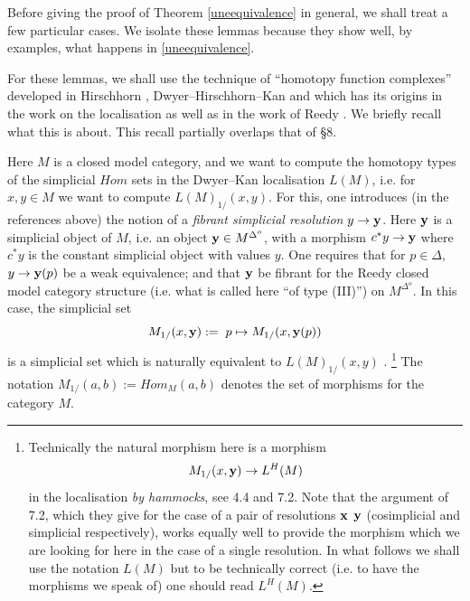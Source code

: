 Before giving the proof of Theorem \ref{uneequivalence}
in general, we shall treat a few particular cases. We isolate
these lemmas because they show well, by
examples, what happens in \ref{uneequivalence}.

For these lemmas, we shall use the technique of ``homotopy function
complexes''
developed in Hirschhorn \cite{Hirschhorn}, Dwyer--Hirschhorn--Kan
\cite{DHK} and which has its origins in the work on the localisation
\cite{DwyerKan3} as well as in the work of Reedy \cite{Reedy}.
We briefly recall what
this is about.
This recall partially overlaps that of \S 8.

Here $M$ is a closed model category, and we want
to compute the homotopy types of the simplicial $Hom$ sets in the
Dwyer--Kan localisation $L(M)$, i.e. for $x,y\in M$ we want to compute
$L(M)_{1/}(x,y)$. For this, one introduces (in the references above)
the notion of a {\em fibrant simplicial resolution} $y\rightarrow {\bf y}$.
Here ${\bf y}$ is a simplicial object of $M$, i.e. an object ${\bf y}\in
M^{\Delta ^o}$, with a morphism $c^{\ast} y\rightarrow {\bf y}$ where
$c^{\ast} y$ is the constant simplicial object with values $y$. One requires
that
for $p\in \Delta$, $y\rightarrow {\bf y}(p)$ be a weak equivalence;
and that ${\bf y}$ be fibrant for the Reedy closed model category
structure (i.e. what is called here ``of
type (III)'') on $M^{\Delta ^o}$.
In this case, the simplicial set
$$
M_{1/}(x, {\bf y}):= \; p \mapsto M_{1/}(x, {\bf y}(p))
$$
is a simplicial set
which is naturally equivalent to $L(M)_{1/}(x,y)$
\cite{DwyerKan3}.
\footnote{
Technically the
natural morphism here is a morphism
$$
M_{1/}(x, {\bf y})\rightarrow L^H(M)
$$
in the localisation {\em by hammocks}, see \cite{DwyerKan3} 4.4 and 7.2.
Note that the argument of \cite{DwyerKan3} 7.2, which they give for
the case of a pair of resolutions ${\bf x}$ ${\bf y}$ (cosimplicial and
simplicial respectively), works equally well to provide the morphism which
we are looking for here in the case of a single resolution. In what follows
we shall use the notation $L(M)$ but to be technically correct (i.e. to have
the morphisms we speak of) one should read $L^H(M)$. }
The notation $M_{1/}(a,b):= Hom _M(a,b)$
denotes the set of morphisms for the category $M$.


